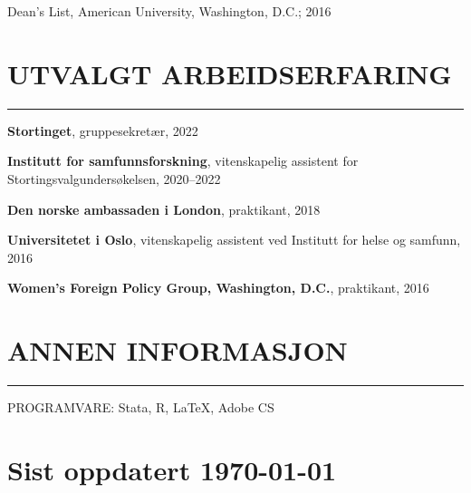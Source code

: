\documentclass{article}
\newcommand{\cvsection}[1]{\section*{\normalfont#1} \vspace{-0.15cm}\hrule \hspace{1.6em}}
\begin{document}
\noindent
\hspace{0.4em}
Dean's List, American University, Washington, D.C.; 2016

\cvsection{UTVALGT ARBEIDSERFARING}

\noindent
\hspace{0.4em}
\textbf{Stortinget}, gruppesekret{\ae}r, 2022

\noindent
\hspace{0.4em}
\textbf{Institutt for samfunnsforskning}, vitenskapelig assistent for Stortingsvalgunders{\o}kelsen, 2020--2022

\noindent
\hspace{0.4em}
\textbf{Den norske ambassaden i London}, praktikant, 2018

\noindent
\hspace{0.4em}
\textbf{Universitetet i Oslo}, vitenskapelig assistent ved Institutt for helse og samfunn, 2016

\noindent
\hspace{0.4em}
\textbf{Women's Foreign Policy Group, Washington, D.C.}, praktikant, 2016


\cvsection{ANNEN INFORMASJON}

\noindent
\hspace{0.4em}
PROGRAMVARE: Stata, R, \LaTeX, Adobe CS

\vfill

\section*{\hfill \normalfont \small Sist oppdatert \today}
\end{document}
